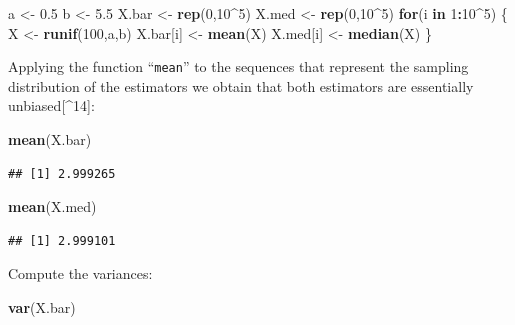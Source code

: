 \documentclass[
]{krantz}
\makeatletter
\newenvironment{Shaded}{\begin{snugshade}}{\end{snugshade}}
\newcommand{\ControlFlowTok}[1]{\textcolor[rgb]{0.13,0.29,0.53}{\textbf{#1}}}
\newcommand{\DecValTok}[1]{\textcolor[rgb]{0.00,0.00,0.81}{#1}}
\newcommand{\FloatTok}[1]{\textcolor[rgb]{0.00,0.00,0.81}{#1}}
\newcommand{\KeywordTok}[1]{\textcolor[rgb]{0.13,0.29,0.53}{\textbf{#1}}}
\newcommand{\NormalTok}[1]{#1}
\newcommand{\OperatorTok}[1]{\textcolor[rgb]{0.81,0.36,0.00}{\textbf{#1}}}
\newcommand{\StringTok}[1]{\textcolor[rgb]{0.31,0.60,0.02}{#1}}
\newenvironment{kframe}{%
\medskip{}
\setlength{\fboxsep}{.8em}
 \def\at@end@of@kframe{}%
 \ifinner\ifhmode%
  \def\at@end@of@kframe{\end{minipage}}%
  \begin{minipage}{\columnwidth}%
 \fi\fi%
 \def\FrameCommand##1{\hskip\@totalleftmargin \hskip-\fboxsep
 \colorbox{shadecolor}{##1}\hskip-\fboxsep
     \hskip-\linewidth \hskip-\@totalleftmargin \hskip\columnwidth}%
 \MakeFramed {\advance\hsize-\width
   \@totalleftmargin\z@ \linewidth\hsize
   \@setminipage}}%
 {\par\unskip\endMakeFramed%
 \at@end@of@kframe}
\renewenvironment{Shaded}{\begin{kframe}}{\end{kframe}}
\theoremstyle{definition}
\theoremstyle{definition}
\theoremstyle{definition}
\theoremstyle{remark}
\makeatother
\begin{document}
\begin{enumerate}
\begin{Shaded}
\begin{Highlighting}[]
\NormalTok{a <-}\StringTok{ }\FloatTok{0.5}
\NormalTok{b <-}\StringTok{ }\FloatTok{5.5}
\NormalTok{X.bar <-}\StringTok{ }\KeywordTok{rep}\NormalTok{(}\DecValTok{0}\NormalTok{,}\DecValTok{10}\OperatorTok{^}\DecValTok{5}\NormalTok{)}
\NormalTok{X.med <-}\StringTok{ }\KeywordTok{rep}\NormalTok{(}\DecValTok{0}\NormalTok{,}\DecValTok{10}\OperatorTok{^}\DecValTok{5}\NormalTok{)}
\ControlFlowTok{for}\NormalTok{(i }\ControlFlowTok{in} \DecValTok{1}\OperatorTok{:}\DecValTok{10}\OperatorTok{^}\DecValTok{5}\NormalTok{) \{}
\NormalTok{  X <-}\StringTok{ }\KeywordTok{runif}\NormalTok{(}\DecValTok{100}\NormalTok{,a,b)}
\NormalTok{  X.bar[i] <-}\StringTok{ }\KeywordTok{mean}\NormalTok{(X)}
\NormalTok{  X.med[i] <-}\StringTok{ }\KeywordTok{median}\NormalTok{(X)}
\NormalTok{\}}
\end{Highlighting}
\end{Shaded}

  Applying the function ``\texttt{mean}'' to the sequences that represent the
  sampling distribution of the estimators we obtain that both estimators
  are essentially unbiased{[}\^{}14{]}:

\begin{Shaded}
\begin{Highlighting}[]
\KeywordTok{mean}\NormalTok{(X.bar)}
\end{Highlighting}
\end{Shaded}

\begin{verbatim}
## [1] 2.999265
\end{verbatim}

\begin{Shaded}
\begin{Highlighting}[]
\KeywordTok{mean}\NormalTok{(X.med)}
\end{Highlighting}
\end{Shaded}

\begin{verbatim}
## [1] 2.999101
\end{verbatim}

  Compute the variances:

\begin{Shaded}
\begin{Highlighting}[]
\KeywordTok{var}\NormalTok{(X.bar)}
\end{Highlighting}
\end{Shaded}


\end{enumerate}
\end{document}
